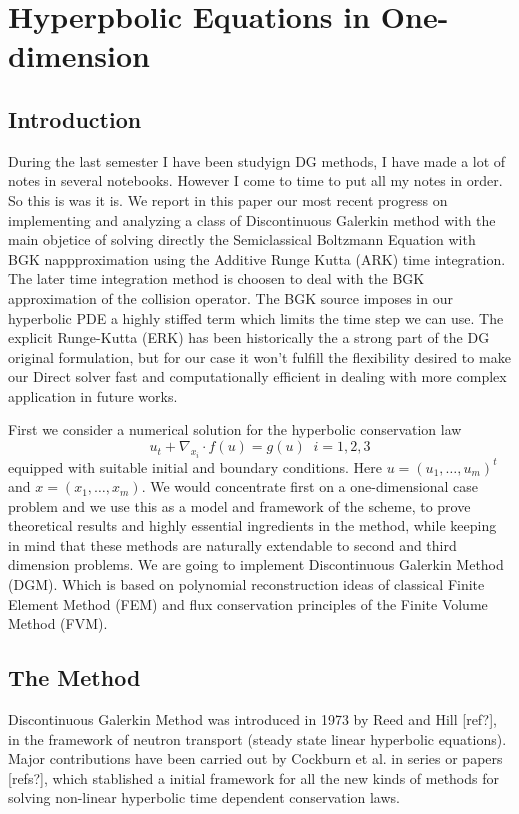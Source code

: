

\chapter{Hyperpbolic Equations in One-dimension}

\section{Introduction}
During the last semester I have been studyign DG methods, I have made a lot of notes in several notebooks. However I come to time to put all my notes in order. So this is was it is.
We report in this paper our most recent progress on implementing and analyzing a class of Discontinuous Galerkin method with the main objetice of solving directly the Semiclassical Boltzmann Equation with BGK nappproximation using the Additive Runge Kutta (ARK) time integration. The later time integration method is choosen to deal with the BGK approximation of the collision operator. The BGK source imposes in our hyperbolic PDE a highly stiffed term which limits the time step we can use. The explicit Runge-Kutta (ERK) has been historically the a strong part of the DG original formulation, but for our case it won't fulfill the flexibility desired to make our Direct solver fast and computationally efficient in dealing with more complex application in future works.

First we consider a numerical solution for the hyperbolic conservation law
\begin{equation}
 u_t + \nabla_{x_i} \cdot f(u) = g(u) \;\; i = 1,2,3
\end{equation}
equipped with suitable initial and boundary conditions. Here
$ u = (u_1, \dots , u_m)^t$ and $x = (x_1, \dots , x_m)$. 
We would concentrate first on a one-dimensional case problem and we use this as a model and framework of the scheme, to prove theoretical results and highly essential ingredients in the method, while keeping in mind that these methods are naturally extendable to second and third dimension problems.
We are going to implement Discontinuous Galerkin Method (DGM). Which is based on polynomial reconstruction ideas of classical Finite Element Method (FEM) and flux conservation principles of the Finite Volume Method (FVM).

\section{The Method}
Discontinuous Galerkin Method was introduced in 1973 by Reed and Hill [ref?], in the framework of neutron transport (steady state linear hyperbolic equations). Major contributions have been carried out by Cockburn et al. in series or papers [refs?], which stablished a initial framework for all the new kinds of methods for solving non-linear hyperbolic time dependent conservation laws.


